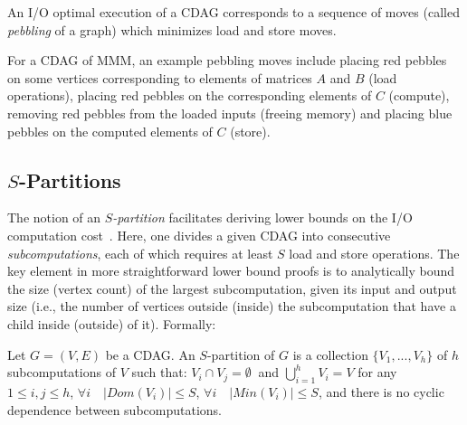 An I/O optimal execution of a CDAG corresponds to a sequence of moves (called 
\emph{pebbling} of a graph) which minimizes load  and store 
 moves.

%
For a CDAG of MMM, an example pebbling moves include placing red pebbles on 
some vertices
corresponding to elements of matrices $A$ and $B$ (load operations), placing 
red
pebbles on the corresponding elements of $C$ (compute), removing red
pebbles from the loaded inputs (freeing memory) and placing blue pebbles on the
computed elements of $C$ (store). 

\subsection{$S$-Partitions}


The notion of an \emph{$S$-partition} facilitates deriving lower bounds on the
I/O computation cost~\cite{redblue}. Here, one divides a given CDAG into
consecutive \emph{subcomputations}, each of which requires at least $S$ load 
and store
operations. The key element in more straightforward
lower bound proofs is to analytically bound the size (vertex count) of
the largest subcomputation, given its input and output size (i.e., the number
of vertices outside (inside) the subcomputation that have a child inside
(outside) of it). 
%
%
%
%
%
Formally:

\begin{defn} \label{df:s-partition}
	Let $G = (V,E)$ be a CDAG. An $S$-partition of $G$ is a collection $\{V_1, 
	...,
	V_h\}$ of $h$ subcomputations of $ V$ such that:  $V_i \cap V_j
	=\emptyset\ $ and $\bigcup_{i=1}^{h} V_i=V$ for any $1 \le i,j \le h$,
	 $\forall i\quad |Dom(V_i)| \le S$,  $\forall i\quad
	|Min(V_i)| \le S$, and  there is no cyclic dependence between
	subcomputations.
\end{defn}

